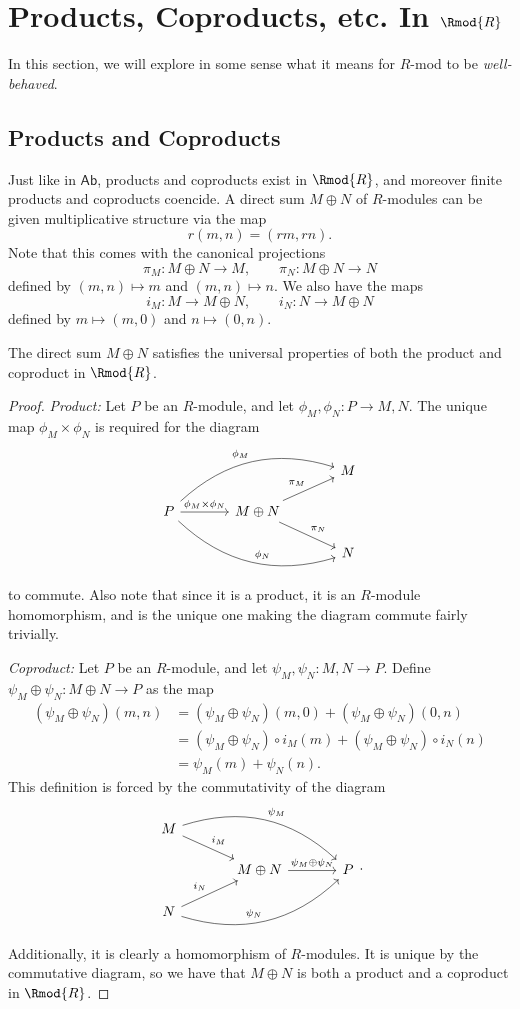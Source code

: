 \section{Products, Coproducts, etc. In $\Rmod{R} $}
In this section, we will explore in some sense what it means for $R$-mod to be \emph{well-behaved}.
\subsection{Products and Coproducts}
Just like in $\mathsf{Ab}$, products and coproducts exist in $\Rmod{R} $, and moreover finite products and coproducts coencide. A direct sum $M\oplus N$ of $R$-modules can be given multiplicative structure via the map
\[
	r(m,n)=(rm,rn)
.\]
Note that this comes with the canonical projections 
\[
	\pi_M : M\oplus N \to M,\qquad \pi_N : M\oplus N \to N
\]
defined by $(m,n)\mapsto m$ and $(m,n)\mapsto n$. We also have the maps
\[
	i_M : M \to M\oplus N,\qquad i_N : N \to M\oplus N
\]
defined by $m\mapsto (m,0)$ and $n\mapsto (0,n)$.
\begin{proposition}\label{prp:3.6.1}
	The direct sum $M\oplus N$ satisfies the universal properties of both the product and coproduct in $\Rmod{R} $.
\end{proposition}
\begin{proof}
	\emph{Product:} Let $P$ be an $R$-module, and let $\phi_M,\phi_N : P \to M,N$. The unique map $\phi_M\times \phi_N$ is required for the diagram
	\[\begin{tikzcd}[row sep=1.5em, column sep=3.5em]
		&&M\\
		P\arrow[rru, bend left, "\phi_M"]\arrow[r, "\phi_M \times \phi_N"]\arrow[rrd, bend right, "\phi_N"]&M\oplus N\arrow[ru, "\pi_M"]\arrow[dr, "\pi_N"]\\
														   &&N
	\end{tikzcd}\]
	to commute. Also note that since it is a product, it is an $R$-module homomorphism, and is the unique one making the diagram commute fairly trivially.

	\emph{Coproduct:} Let $P$ be an $R$-module, and let $\psi_M,\psi_N : M,N \to P$. Define $\psi_M \oplus \psi_N : M\oplus N \to P$ as the map
	\begin{align*}
		(\psi_M\oplus \psi_N)(m,n)&=(\psi_M \oplus \psi_N)(m,0)+(\psi _M\oplus \psi _N)(0,n)\\
					  &=(\psi_M \oplus \psi _N)\circ i_M(m)+(\psi _M\oplus \psi _N)\circ i_N(n)\\
					  &=\psi _M(m)+\psi _N(n)
	.\end{align*}
	This definition is forced by the commutativity of the diagram
	\[\begin{tikzcd}[row sep=1.5em, column sep=3.5em]
		M\arrow[drr, bend left, "\psi _M"]\arrow[dr, "i_M"]\\
		&M\oplus N\arrow[r, "\psi _M\oplus \psi _N"]&P\\
		N\arrow[ru, "i_N"]\arrow[rru, bend right, "\psi _N"]
	\end{tikzcd}.\]
	Additionally, it is clearly a homomorphism of $R$-modules. It is unique by the commutative diagram, so we have that $M\oplus N$ is both a product and a coproduct in $\Rmod{R} $.
\end{proof}


